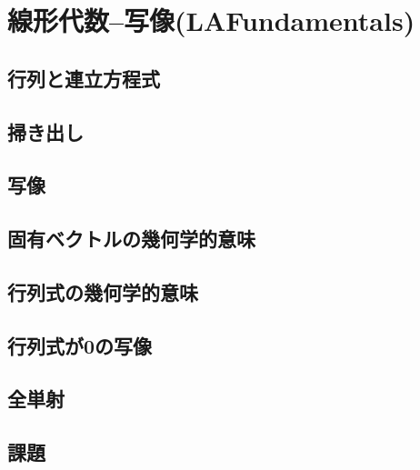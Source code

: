 \documentclass[10pt,a4j]{jreport}
\begin{document}
\chapter{線形代数--写像(LAFundamentals)}
\section{行列と連立方程式}

\section{掃き出し}

\section{写像}

\section{固有ベクトルの幾何学的意味}

\section{行列式の幾何学的意味}

\section{行列式が0の写像}

\section{全単射}

\section{課題}

\end{document}
